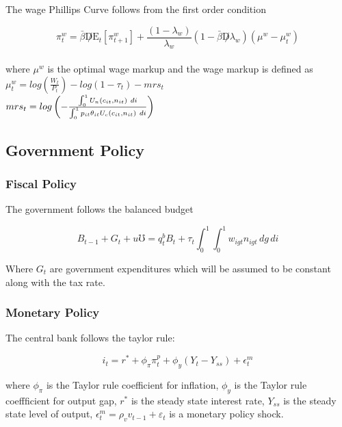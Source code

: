 \documentclass[titlepage]{\econtex}\providecommand{\texname}{BufferStockTheory}
\begin{document}
The wage Phillips Curve follows from the first order condition


$$ \pi_{t}^{w} =   \bar{\beta} \not D  \mathrm{E}_{t} \left[ \pi_{t+1}^{w}\right] + \frac{(1-\lambda_{w})}{\lambda_{w}} (1- \bar{\beta} \not D \lambda_{w}) (\mu^{w} - \mu_{t}^{w})$$ \\

where $\mu^{w}$ is the optimal wage markup and the wage markup is defined as \\ 

$\mu_{t}^{w} = log\left( \frac{W_{t}}{P_{t}}\right)  - log\left(1 -\tau_{t}\right) - mrs_{t}$ \\


$ mrs_{t} = log \left(- \frac{\int_{0}^{1}   U_{n} \left(c_{i t}, n_{i t} \right) \ d i  }{\int_{0}^{1}  p_{it} \theta_{it} U_{c} \left(c_{i t}, n_{i t} \right) \  di } \right) \\ \\ $


\hypertarget{Government Policy}{}
\subsection{Government Policy}



\hypertarget{Fiscal Policy}{}
\subsubsection{Fiscal Policy}

The government follows the balanced budget

$$ B_{t-1} + G_{t} + \mathit{u} \mho =   q^{b}_{t} B_{t} +  \tau_{t} \int_{0}^{1} \int_{0}^{1} w_{igt} n_{igt} \, dg \, di$$ 

Where $G_{t} $ are government expenditures which will be assumed to be constant along with the tax rate.



\hypertarget{Monetary Policy}{}
\subsubsection{Monetary Policy}


The central bank follows the taylor rule: 

$$i_{t} = r^{*} +\phi_{\pi} \pi^{p}_{t} + \phi_{y} (Y_{t} - Y_{ss}) + \epsilon^{m}_{t}$$

where $\phi_{\pi}$ is the Taylor rule coefficient for inflation, $\phi_{y}$ is the Taylor rule coeffficient for output gap,  $r^{*}$ is the steady state interest rate, $Y_{ss}$ is the steady state level of output,  $\epsilon^{m}_{t} = \rho_{v} v_{t-1} +\varepsilon_{t}$ is a monetary policy shock. \\ \\
\end{document}
